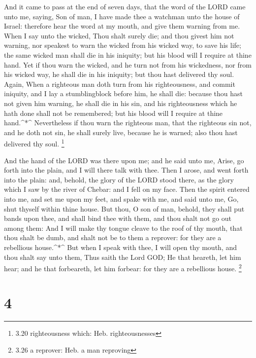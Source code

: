  And it came to pass at the end of seven days, that the
word of the LORD came unto me, saying,  Son of man, I have
made thee a watchman unto the house of Israel: therefore hear the word
at my mouth, and give them warning from me.  When I say
unto the wicked, Thou shalt surely die; and thou givest him not warning,
nor speakest to warn the wicked from his wicked way, to save his life;
the same wicked man shall die in his iniquity; but his blood will I
require at thine hand.  Yet if thou warn the wicked, and he
turn not from his wickedness, nor from his wicked way, he shall die in
his iniquity; but thou hast delivered thy soul.  Again,
When a righteous man doth turn from his righteousness, and commit
iniquity, and I lay a stumblingblock before him, he shall die: because
thou hast not given him warning, he shall die in his sin, and his
righteousness which he hath done shall not be remembered; but his blood
will I require at thine hand.\^{}*\^{}  Nevertheless if
thou warn the righteous man, that the righteous sin not, and he doth not
sin, he shall surely live, because he is warned; also thou hast
delivered thy soul. \footnote{3.20 righteousness which: Heb.
  righteousnesses}

 And the hand of the LORD was there upon me; and he said
unto me, Arise, go forth into the plain, and I will there talk with
thee.  Then I arose, and went forth into the plain: and,
behold, the glory of the LORD stood there, as the glory which I saw by
the river of Chebar: and I fell on my face.  Then the
spirit entered into me, and set me upon my feet, and spake with me, and
said unto me, Go, shut thyself within thine house.  But
thou, O son of man, behold, they shall put bands upon thee, and shall
bind thee with them, and thou shalt not go out among them: 
And I will make thy tongue cleave to the roof of thy mouth, that thou
shalt be dumb, and shalt not be to them a reprover: for they are a
rebellious house.\^{}*\^{}  But when I speak with thee, I
will open thy mouth, and thou shalt say unto them, Thus saith the Lord
GOD; He that heareth, let him hear; and he that forbeareth, let him
forbear: for they are a rebellious house. \footnote{3.26 a reprover:
  Heb. a man reproving}

\hypertarget{section-3}{%
\section{4}\label{section-3}}

